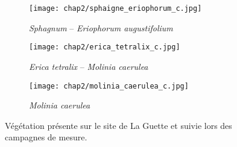 \begin{figure}[htbp]
    \centering
    \begin{subfigure}[b]{.98\textwidth} %
        \centering \texttt{[image: chap2/sphaigne\_eriophorum\_c.jpg]}
        \caption{\textit{Sphagnum} -- \textit{Eriophorum augustifolium}}\label{fig:sphg_erio}
    \end{subfigure}
    
    \begin{subfigure}[b]{0.49\textwidth}
        \centering \texttt{[image: chap2/erica\_tetralix\_c.jpg]}
        \caption{\textit{Erica tetralix} -- \textit{Molinia caerulea}}\label{fig:erica}
    \end{subfigure}
    \begin{subfigure}[b]{0.49\textwidth}
        \centering \texttt{[image: chap2/molinia\_caerulea\_c.jpg]}
        \caption{\textit{Molinia caerulea}}\label{fig:mol}
    \end{subfigure}

    \caption{Végétation présente sur le site de La Guette et suivie lors des campagnes de mesure.}\label{fig:veg}
\end{figure}


%
%

